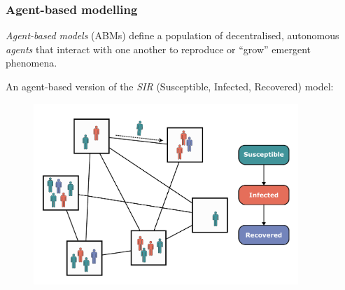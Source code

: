 \documentclass[8pt]{beamer}
\begin{document}
\begin{frame}
\frametitle{Agent-based modelling}

\textit{Agent-based models} (ABMs) define a population of decentralised, autonomous \textit{agents} that interact with one another to reproduce or ``grow'' emergent phenomena.

\vspace{.25cm}
An agent-based version of the \textit{SIR} (Susceptible, Infected, Recovered) model:\vspace{-.2cm}



%         

\begin{figure}[htbp]
   \centering
   \begin{adjustbox}{center}
   \includegraphics[width=10cm]{figs/mcs-pres-abm.pdf} 
   \end{adjustbox}
   
\end{figure}




\end{frame}
\end{document}
